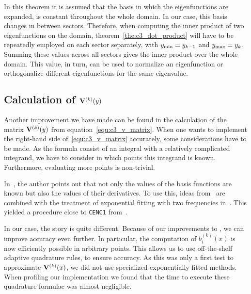 In this theorem it is assumed that the basis in which the eigenfunctions are expanded, is constant throughout the whole domain. In our case, this basis changes in between sectors. Therefore, when computing the inner product of two eigenfunctions on the domain, theorem~\ref{the:c3_dot_product} will have to be repeatedly employed on each sector separately, with ${y_{\text{min}}} = y_{k-1}$ and ${y_{\text{max}}} = y_k$. Summing these values across all sectors gives the inner product over the whole domain. This value, in turn, can be used to normalize an eigenfunction or orthogonalize different eigenfunctions for the same eigenvalue.

\subsection{Calculation of \texorpdfstring{$\vb{V}^{(k)}(y)$}{Vk(y)}}\label{sec:c3_calculate_vk}

Another improvement we have made can be found in the calculation of the matrix $\vb{V}^{(k)}(y)$ from equation~\eqref{equ:c3_v_matrix}. When one wants to implement the right-hand side of~\eqref{equ:c3_v_matrix} accurately, some considerations have to be made. As the formula consist of an integral with a relatively complicated integrand, we have to consider in which points this integrand is known. Furthermore, evaluating more points is non-trivial.

In~\cite{ixaru_new_2010}, the author points out that not only the values of the basis functions are known but also the values of their derivatives. To use this, ideas from~\cite{kim_quadrature_2002} are combined with the treatment of exponential fitting with two frequencies in~\cite{ixaru_operations_1997}. This yielded a procedure close to \texttt{CENC1} from~\cite{ixaru_exponential_2004}.

In our case, the story is quite different. Because of our improvements to \matslise{}, we can improve accuracy even further. In particular, the computation of $b_i^{(k)}(x)$ is now efficiently possible in arbitrary points. This allows us to use off-the-shelf adaptive quadrature rules, to ensure accuracy. As this was only a first test to approximate $\vb{V}^{(k)}(x)$, we did not use specialized exponentially fitted methods. When profiling our implementation we found that the time to execute these quadrature formulae was almost negligible.

